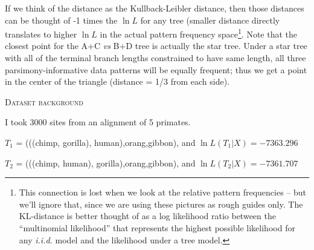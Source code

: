 \documentclass[11pt]{article}
\renewcommand{\section}[2]{%
\bigskip
\begin{center}
\begin{Large}
\normalfont\scshape #2
\medskip
\end{Large}
\end{center}}
\newcommand{\lnL}{\ln L}
\begin{document}
If we think of the distance as the Kullback-Leibler distance, then those distances can be thought of -1 times the $\lnL$ for any tree (smaller distance directly translates to higher $\lnL$ in the actual pattern frequency space\footnote{This connection is lost when we look at the relative pattern frequencies -- but we'll ignore that, since we are using these pictures as rough guides only. The KL-distance is better thought of as a log likelihood ratio between the ``multinomial likelihood'' \citep[{\em aka} th ``unconstrained likelihood''][]{Goldman1993} that represents the highest possible likelihood for any {\em i.i.d.} model and the likelihood under a tree model.}.
Note that the closest point for the A+C {\em vs} B+D tree is actually the star tree.
Under a star tree with all of the terminal branch lengths constrained to have same length, all three parsimony-informative data patterns will be equally frequent; thus we get a point in the center of the triangle (distance = 1/3 from each side).


\newpage
\section*{Dataset background}
I took 3000 sites from an alignment of 5 primates.

$T_1$ = (((chimp, gorilla), human),orang,gibbon), and $\ln L(T_1|X) = -7363.296$\par
$T_2$ = (((chimp, human), gorilla),orang,gibbon), and $\ln L(T_2|X) = -7361.707$\par
\end{document}
